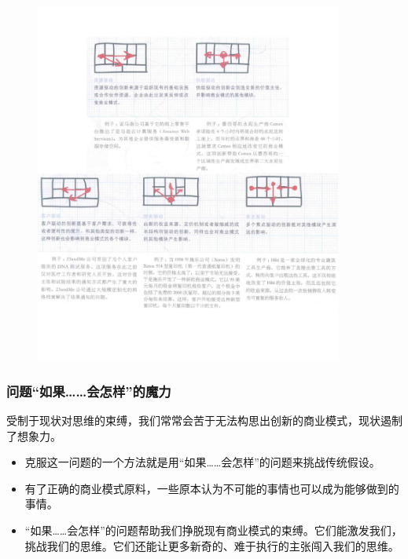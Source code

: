 \begin{figure}[H]
	\centering
	\vspace{-0.5em}
	\includegraphics[width=0.9\textwidth]{img/商业模式创新的焦点.pdf}
    \vspace{-0.5em}
\end{figure}

\subsubsection{问题“如果……会怎样”的魔力}

受制于现状对思维的束缚，我们常常会苦于无法构思出创新的商业模式，现状遏制了想象力。
\begin{itemize}
    \item 克服这一问题的一个方法就是用“如果……会怎样”的问题来挑战传统假设。
    \item 有了正确的商业模式原料，一些原本认为不可能的事情也可以成为能够做到的事情。
    \item “如果……会怎样”的问题帮助我们挣脱现有商业模式的束缚。它们能激发我们，挑战我们的思维。它们还能让更多新奇的、难于执行的主张闯入我们的思维。
\end{itemize}

